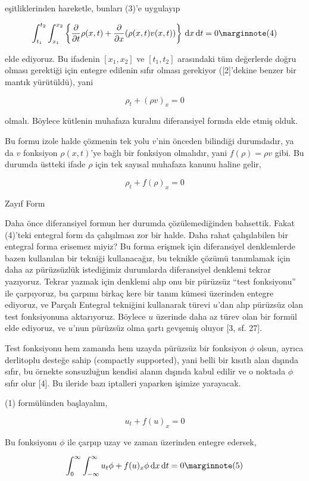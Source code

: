 \documentclass[12pt,fleqn]{article}\usepackage{../../common}
\begin{document}
eşitliklerinden hareketle, bunları (3)'e uygulayıp

$$
\int _{t_1}^{t_2} \int _{x_1}^{x_2}  \left\{
\frac{\partial }{\partial t} \rho(x,t)  +
\frac{\partial }{\partial x} (\rho(x,t)v(x,t))
\right\} \ud x \ud t = 0
\mlabel{4}
$$

elde ediyoruz. Bu ifadenin $[x_1,x_2]$ ve $[t_1,t_2]$ arasındaki tüm değerlerde
doğru olması gerektiği için entegre edilenin sıfır olması gerekiyor ([2]'dekine
benzer bir mantık yürütüldü), yani

$$
\rho_t + (\rho v)_x = 0
$$

olmalı. Böylece kütlenin muhafaza kuralını diferansiyel formda elde etmiş olduk.

Bu formu izole halde çözmenin tek yolu $v$'nin önceden bilindiği durumdadır, ya
da $v$ fonksiyon $\rho(x,t)$'ye bağlı bir fonksiyon olmalıdır, yani
$f(\rho) = \rho v$ gibi. Bu durumda üstteki ifade $\rho$ için tek sayısal
muhafaza kanunu haline gelir,

$$
\rho_t + f(\rho)_x = 0
$$

Zayıf Form

Daha önce diferansiyel formun her durumda çözülemediğinden bahsettik. Fakat
(4)'teki entegral form da çalışılması zor bir halde. Daha rahat çalışılabilen
bir entegral forma erisemez miyiz? Bu forma erişmek için diferansiyel
denklemlerde bazen kullanılan bir tekniği kullanacağız, bu teknikle çözümü
tanımlamak için daha az pürüzsüzlük istediğimiz durumlarda diferansiyel denklemi
tekrar yazıyoruz. Tekrar yazmak için denklemi alıp onu bir pürüzsüz ``test
fonksiyonu'' ile çarpıyoruz, bu çarpımı birkaç kere bir tanım kümesi üzerinden
entegre ediyoruz, ve Parçalı Entegral tekniğini kullanarak türevi $u$'dan alıp
pürüzsüz olan test fonksiyonuna aktarıyoruz. Böylece $u$ üzerinde daha az
türev olan bir formül elde ediyoruz, ve $u$'nun pürüzsüz olma şartı gevşemiş
oluyor [3, sf. 27].

Test fonksiyonu hem zamanda hem uzayda pürüzsüz bir fonksiyon $\phi$ olsun,
ayrıca derlitoplu desteğe sahip (compactly supported), yani belli bir kısıtlı
alan dışında sıfır, bu örnekte sonsuzluğun kendisi alanın dışında kabul edilir
ve o noktada $\phi$ sıfır olur [4]. Bu ileride bazı iptalleri yaparken işimize
yarayacak.

(1) formülünden başlayalım,

$$
u_t + f(u)_x = 0
$$

Bu fonksiyonu $\phi$ ile çarpıp uzay ve zaman üzerinden entegre edersek,

$$
\int _{0}^{\infty} \int _{-\infty}^{\infty} u_t \phi + f(u)_x \phi \ud x \ud t = 0
\mlabel{5}
$$
\end{document}
